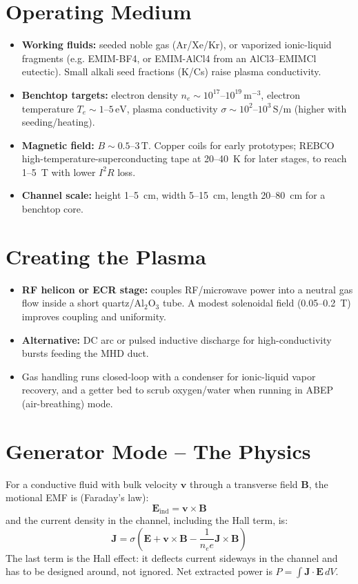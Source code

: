 \documentclass[12pt]{article}
\begin{document}
\section{Operating Medium}
\begin{itemize}
    \item \textbf{Working fluids:} seeded noble gas (Ar/Xe/Kr), or vaporized ionic-liquid fragments (e.g. EMIM-BF4, or EMIM-AlCl4 from an AlCl3--EMIMCl eutectic). Small alkali seed fractions (K/Cs) raise plasma conductivity.
    \item \textbf{Benchtop targets:} electron density $n_e \sim 10^{17}$--$10^{19}\,\text{m}^{-3}$, electron temperature $T_e \sim 1$--$5\,\text{eV}$, plasma conductivity $\sigma \sim 10^{2}$--$10^{3}\,\text{S/m}$ (higher with seeding/heating).
    \item \textbf{Magnetic field:} $B \sim 0.5$--$3\,\text{T}$. Copper coils for early prototypes; REBCO high-temperature-superconducting tape at 20--40~K for later stages, to reach 1--5~T with lower $I^2R$ loss.
    \item \textbf{Channel scale:} height 1--5~cm, width 5--15~cm, length 20--80~cm for a benchtop core.
\end{itemize}

\section{Creating the Plasma}
\begin{itemize}
    \item \textbf{RF helicon or ECR stage:} couples RF/microwave power into a neutral gas flow inside a short quartz/Al$_2$O$_3$ tube. A modest solenoidal field (0.05--0.2~T) improves coupling and uniformity.
    \item \textbf{Alternative:} DC arc or pulsed inductive discharge for high-conductivity bursts feeding the MHD duct.
    \item Gas handling runs closed-loop with a condenser for ionic-liquid vapor recovery, and a getter bed to scrub oxygen/water when running in ABEP (air-breathing) mode.
\end{itemize}

\section{Generator Mode -- The Physics}
For a conductive fluid with bulk velocity $\mathbf{v}$ through a transverse field $\mathbf{B}$, the motional EMF is (Faraday's law):
\[
\mathbf{E}_{\text{ind}} = \mathbf{v} \times \mathbf{B}
\]
and the current density in the channel, including the Hall term, is:
\[
\mathbf{J} = \sigma \left( \mathbf{E} + \mathbf{v} \times \mathbf{B} - \frac{1}{n_e e} \mathbf{J} \times \mathbf{B} \right)
\]
The last term is the Hall effect: it deflects current sideways in the channel and has to be designed around, not ignored. Net extracted power is $P = \int \mathbf{J} \cdot \mathbf{E} \, dV$.
\end{document}
